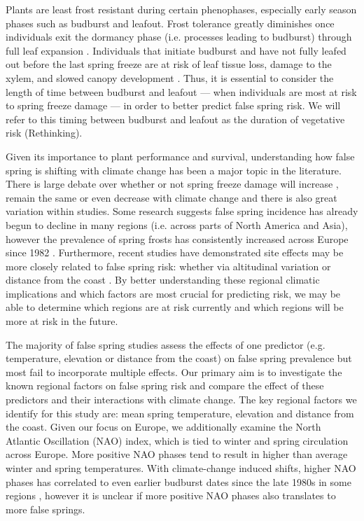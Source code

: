 \documentclass{article}\usepackage[]{graphicx}\usepackage[]{color}
\begin{document}
Plants are least frost resistant during certain phenophases, especially early season phases such as budburst and leafout. Frost tolerance greatly diminishes once individuals exit the dormancy phase (i.e. processes leading to budburst) through full leaf expansion \citep{Lenz2016, Vitasse2014}. Individuals that initiate budburst and have not fully leafed out before the last spring freeze are at risk of leaf tissue loss, damage to the xylem, and slowed canopy development \citep{Gu2008, Hufkens2012}. Thus, it is essential to consider the length of time between budburst and leafout --- when individuals are most at risk to spring freeze damage \citep{Lenz2016} --- in order to better predict false spring risk. We will refer to this timing between budburst and leafout as the duration of vegetative risk (Rethinking).

Given its importance to plant performance and survival, understanding how false spring is shifting with climate change has been a major topic in the literature. There is large debate over whether or not spring freeze damage will increase \citep{Augspurger2013, Hannenin1991, Labe2016}, remain the same \citep{Scheifinger2003} or even decrease \citep{Kramer1994, Vitra2017} with climate change and there is also great variation within studies. Some research suggests false spring incidence has already begun to decline in many regions (i.e. across parts of North America and Asia), however the prevalence of spring frosts has consistently increased across Europe since 1982 \citep{Liu2018}. Furthermore, recent studies have demonstrated site effects may be more closely related to false spring risk: whether via altitudinal variation \citep{Ma2018, Vitra2017} or distance from the coast \citep{ Ma2018, Wypych2016a}. By better understanding these regional climatic implications and which factors are most crucial for predicting risk, we may be able to determine which regions are at risk currently and which regions will be more at risk in the future.

The majority of false spring studies assess the effects of one predictor (e.g. temperature, elevation or distance from the coast) on false spring prevalence but most fail to incorporate multiple effects. Our primary aim is to investigate the known regional factors on false spring risk and compare the effect of these predictors and their interactions with climate change. The key regional factors we identify for this study are: mean spring temperature, elevation and distance from the coast. Given our focus on Europe, we additionally examine the North Atlantic Oscillation (NAO) index, which is tied to winter and spring circulation across Europe. More positive NAO phases tend to result in higher than average winter and spring temperatures. With climate-change induced shifts, higher NAO phases has correlated to even earlier budburst dates since the late 1980s in some regions \citep{Chmielewski2001}, however it is unclear if more positive NAO phases also translates to more false springs.
\end{document}

